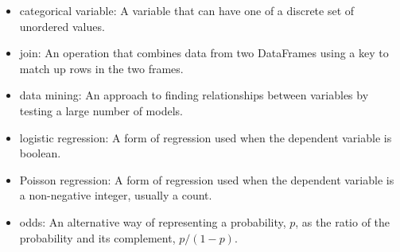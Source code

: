 \begin{itemize}
\item categorical variable: A variable that can have one of a
discrete set of unordered values.

\item join: An operation that combines data from two DataFrames
using a key to match up rows in the two frames.

\item data mining: An approach to finding relationships between
variables by testing a large number of models.

\item logistic regression: A form of regression used when the
dependent variable is boolean.

\item Poisson regression: A form of regression used when the
dependent variable is a non-negative integer, usually a count.

\item odds: An alternative way of representing a probability, $p$, as
  the ratio of the probability and its complement, $p / (1-p)$.

\end{itemize}

